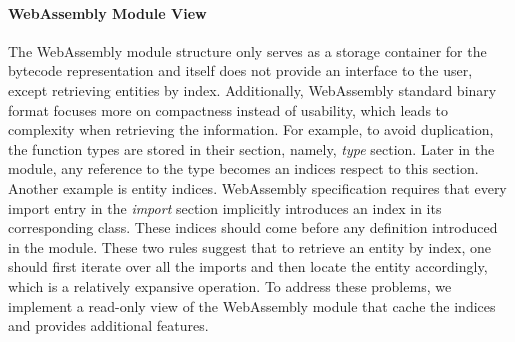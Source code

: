 \paragraph{WebAssembly Module View}
The WebAssembly module structure only serves as a storage container for the bytecode representation and itself does not provide an interface to the user, except retrieving entities by index. Additionally, WebAssembly standard binary format focuses more on compactness instead of usability, which leads to complexity when retrieving the information. For example, to avoid duplication, the function types are stored in their section, namely, \emph{type} section. Later in the module, any reference to the type becomes an indices respect to this section. Another example is entity indices. WebAssembly specification requires that every import entry in the \emph{import} section implicitly introduces an index in its corresponding class. These indices should come before any definition introduced in the module. These two rules suggest that to retrieve an entity by index, one should first iterate over all the imports and then locate the entity accordingly, which is a relatively expansive operation. To address these problems, we implement a read-only view of the WebAssembly module that cache the indices and provides additional features. 

